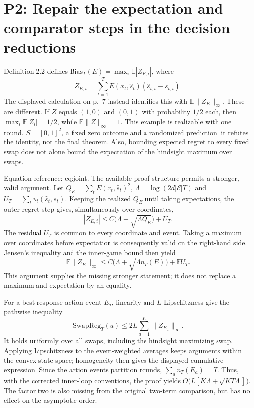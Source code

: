\documentclass[10pt]{article}
\begin{document}
\section*{P2: Repair the expectation and comparator steps in the decision reductions}
Definition 2.2 defines \(\mathrm{Bias}_T(E)=\max_i\mathbb E|Z_{E,i}|\), where \[Z_{E,i}=\sum_{t=1}^T E(x_t,\widehat s_t)(\widehat s_{t,i}-s_{t,i}).\] The displayed calculation on p. 7 instead identifies this with \(\mathbb E\|Z_E\|_\infty\). These are different. If \(Z\) equals \((1,0)\) and \((0,1)\) with probability \(1/2\) each, then \(\max_i\mathbb E|Z_i|=1/2\), while \(\mathbb E\|Z\|_\infty=1\). This example is realizable with one round, \(S=[0,1]^2\), a fixed zero outcome and a randomized prediction; it refutes the identity, not the final theorem. Also, bounding expected regret to every fixed swap does not alone bound the expectation of the hindsight maximum over swaps.\par
Equation reference: eq:joint. The available proof structure permits a stronger, valid argument. Let \(Q_E=\sum_t E(x_t,\widehat s_t)^2\), \(\Lambda=\log(2d|\mathcal E|T)\) and \(U_T=\sum_t u_t(\widehat s_t,s_t)\). Keeping the realized \(Q_E\) until taking expectations, the outer-regret step gives, simultaneously over coordinates, \[
 |Z_{E,i}|\leq C\bigl(\Lambda+\sqrt{\Lambda Q_E}\bigr)+U_T.\] The residual \(U_T\) is common to every coordinate and event. Taking a maximum over coordinates before expectation is consequently valid on the right-hand side. Jensen’s inequality and the inner-game bound then yield \[\mathbb E\|Z_E\|_\infty
 \leq C\bigl(\Lambda+\sqrt{\Lambda n_T(E)}\bigr)+\mathbb E U_T.\] This argument supplies the missing stronger statement; it does not replace a maximum and expectation by an equality.\par
For a best-response action event \(E_a\), linearity and \(L\)-Lipschitzness give the pathwise inequality \[\mathrm{SwapReg}_T(u)\leq 2L\sum_{a=1}^K\|Z_{E_a}\|_\infty.\] It holds uniformly over all swaps, including the hindsight maximizing swap. Applying Lipschitzness to the event-weighted averages keeps arguments within the convex state space; homogeneity then gives the displayed cumulative expression. Since the action events partition rounds, \(\sum_a n_T(E_a)=T\). Thus, with the corrected inner-loop conventions, the proof yields \(O\bigl(L[K\Lambda+\sqrt{KT\Lambda}]\bigr)\). The factor two is also missing from the original two-term comparison, but has no effect on the asymptotic order.\par
\end{document}
